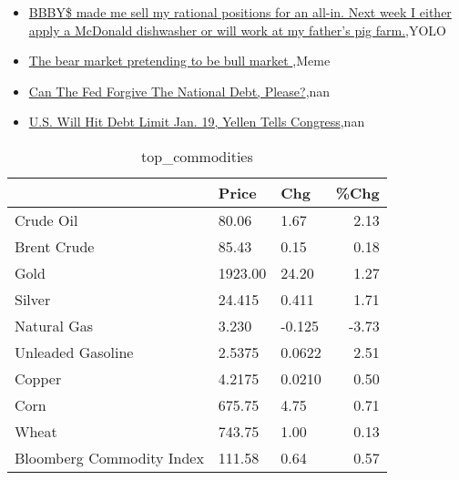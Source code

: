 \documentclass{article}%
\begin{document}
%
\begin{itemize}%
\item%
\href{https://reddit.com/r/wallstreetbets/comments/10bn44r/bbby\_made\_me\_sell\_my\_rational\_positions\_for\_an/}{BBBY\$ made me sell my rational positions for an all-in. Next week I either apply a McDonald dishwasher or will work at my father's pig farm.},YOLO%
\item%
\href{https://reddit.com/r/wallstreetbets/comments/10blqz1/the\_bear\_market\_pretending\_to\_be\_bull\_market/}{The bear market  pretending to be bull market },Meme%
\item%
\href{https://reddit.com/r/Economics/comments/10b2oah/can\_the\_fed\_forgive\_the\_national\_debt\_please/}{Can The Fed Forgive The National Debt, Please?},nan%
\item%
\href{https://reddit.com/r/Economics/comments/10b0ilu/us\_will\_hit\_debt\_limit\_jan\_19\_yellen\_tells/}{U.S. Will Hit Debt Limit Jan. 19, Yellen Tells Congress},nan%
\end{itemize}%


\begin{table}[htbp]%
\caption{top\_commodities}%
\centering%
\begin{adjustbox}{width=1\textwidth}%
\begin{tabular}{lllr}
\toprule
                          &   Price &    Chg &  \%Chg \\
\midrule
               Crude Oil  &   80.06 &   1.67 &  2.13 \\
             Brent Crude  &   85.43 &   0.15 &  0.18 \\
                    Gold  & 1923.00 &  24.20 &  1.27 \\
                  Silver  &  24.415 &  0.411 &  1.71 \\
             Natural Gas  &   3.230 & -0.125 & -3.73 \\
       Unleaded Gasoline  &  2.5375 & 0.0622 &  2.51 \\
                  Copper  &  4.2175 & 0.0210 &  0.50 \\
                    Corn  &  675.75 &   4.75 &  0.71 \\
                   Wheat  &  743.75 &   1.00 &  0.13 \\
Bloomberg Commodity Index &  111.58 &   0.64 &  0.57 \\
\bottomrule
\end{tabular}
%
\end{adjustbox}%
\end{table}
\end{document}
